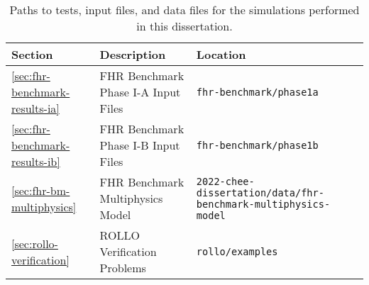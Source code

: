 \begin{landscape}
\begin{table}[htbp!]
    \centering
    \onehalfspacing
    \caption{Paths to tests, input files, and data files for the simulations performed 
    in this dissertation. }
    \label{tab:reproducibility}
    \begin{tabular}{p{2cm}p{8cm}p{12cm}}
    \toprule
    \textbf{Section} & \textbf{Description} & \textbf{Location} \\
    \midrule
    \ref{sec:fhr-benchmark-results-ia} & FHR Benchmark Phase I-A Input Files & 
    \texttt{fhr-benchmark/phase1a} \\ 
    \midrule
    \ref{sec:fhr-benchmark-results-ib} & FHR Benchmark Phase I-B Input Files & 
    \texttt{fhr-benchmark/phase1b} \\ 
    \midrule
    \ref{sec:fhr-bm-multiphysics} & FHR Benchmark Multiphysics Model & 
    \texttt{2022-chee-dissertation/data/fhr-benchmark-multiphysics-model} \\ 
    \midrule
    \ref{sec:rollo-verification} & ROLLO Verification Problems & 
    \texttt{rollo/examples} \\ 
    \bottomrule
    \end{tabular}
\end{table}
\end{landscape}